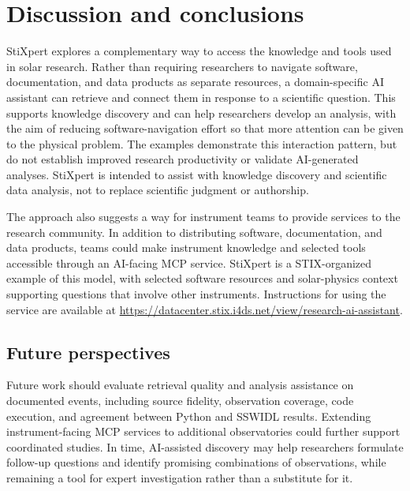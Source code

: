 \section{Discussion and conclusions}
\label{sec:discussion}

StiXpert explores a complementary way to access the knowledge and tools used in solar
research.
Rather than requiring researchers to navigate software, documentation, and data
products as separate resources, a domain-specific AI assistant can retrieve and connect
them in response to a scientific question.
This supports knowledge discovery and can help researchers develop an analysis, with
the aim of reducing software-navigation effort so that more attention can be given to
the physical problem.
The examples demonstrate this interaction pattern, but do not establish improved
research productivity or validate AI-generated analyses.
StiXpert is intended to assist with knowledge discovery and scientific data analysis,
not to replace scientific judgment or authorship.

The approach also suggests a way for instrument teams to provide services to the
research community.
In addition to distributing software, documentation, and data products, teams could
make instrument knowledge and selected tools accessible through an AI-facing MCP
service.
StiXpert is a STIX-organized example of this model, with selected software resources and
solar-physics context supporting questions that involve other instruments.
Instructions for using the service are available at
\url{https://datacenter.stix.i4ds.net/view/research-ai-assistant}.


\subsection{Future perspectives}
\label{sec:future}

Future work should evaluate retrieval quality and analysis assistance on documented
events, including source fidelity, observation coverage, code execution, and agreement
between Python and SSWIDL results.
Extending instrument-facing MCP services to additional observatories could further
support coordinated studies.
In time, AI-assisted discovery may help researchers formulate follow-up questions and
identify promising combinations of observations, while remaining a tool for expert
investigation rather than a substitute for it.
